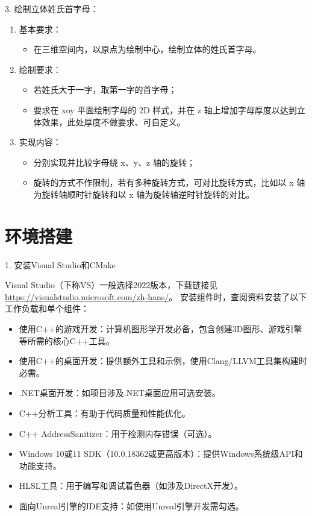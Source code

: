 \documentclass[a4paper]{article}
\begin{document}
3. 绘制立体姓氏首字母：
\begin{enumerate}
    \item[(1)] 基本要求：
    \begin{itemize}
        \item 在三维空间内，以原点为绘制中心，绘制立体的姓氏首字母。
    \end{itemize}
    \item[(2)] 绘制要求：
    \begin{itemize}
        \item 若姓氏大于一字，取第一字的首字母；
        \item 要求在 xoy 平面绘制字母的 2D 样式，并在 z 轴上增加字母厚度以达到立体效果，此处厚度不做要求、可自定义。
    \end{itemize}
    \item[(3)] 实现内容：
    \begin{itemize}
        \item 分别实现并比较字母绕 x、y、z 轴的旋转；
        \item 旋转的方式不作限制，若有多种旋转方式，可对比旋转方式，比如以 x 轴为旋转轴顺时针旋转和以 x 轴为旋转轴逆时针旋转的对比。
    \end{itemize}
\end{enumerate}

\section{环境搭建}

1. 安装Visual Studio和CMake

Visual Studio（下称VS）一般选择2022版本，下载链接见\url{https://visualstudio.microsoft.com/zh-hans/}。  
安装组件时，查阅资料安装了以下工作负载和单个组件：

\begin{itemize}
    \item 使用C++的游戏开发：计算机图形学开发必备，包含创建3D图形、游戏引擎等所需的核心C++工具。
    \item 使用C++的桌面开发：提供额外工具和示例，使用Clang/LLVM工具集构建时必需。
    \item .NET桌面开发：如项目涉及.NET桌面应用可选安装。
    \item C++分析工具：有助于代码质量和性能优化。
    \item C++ AddressSanitizer：用于检测内存错误（可选）。
    \item Windows 10或11 SDK（10.0.18362或更高版本）：提供Windows系统级API和功能支持。
    \item HLSL工具：用于编写和调试着色器（如涉及DirectX开发）。
    \item 面向Unreal引擎的IDE支持：如使用Unreal引擎开发需勾选。
\end{itemize}
\end{document}
